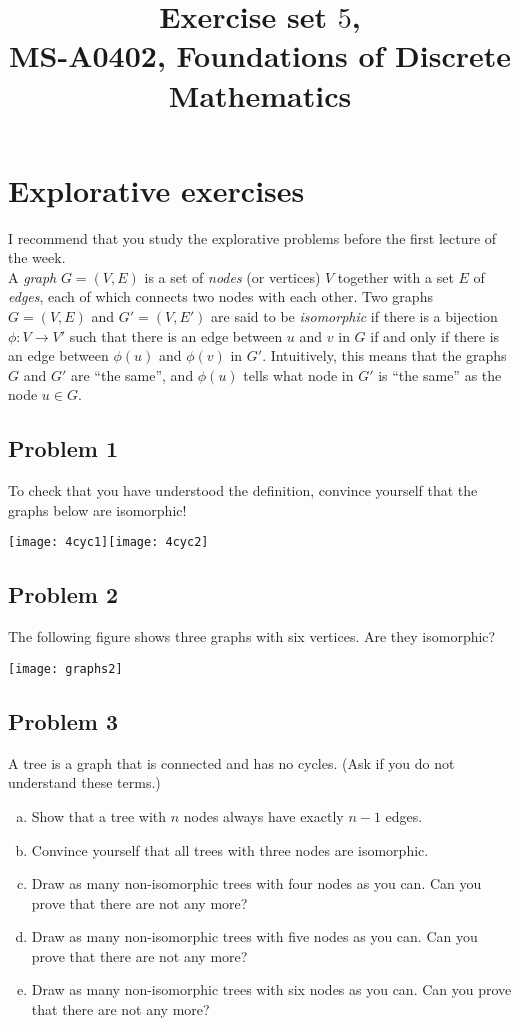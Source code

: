 \documentclass{amsart}
\title{Exercise set $5$, \\ MS-A0402, Foundations of Discrete Mathematics}
\theoremstyle{definition} \newtheorem*{definition}{Definition}
\theoremstyle{remark} \newtheorem*{ex}{Example}
\begin{document}
\hspace{-1cm}
\maketitle
 
\section*{Explorative exercises}
I recommend that you study the explorative problems before the first lecture of the week.\\

A {\em graph} $G=(V,E)$ is a set of {\em nodes} (or vertices) $V$ together with a set $E$ of {\em edges}, each of which connects two nodes with each other. Two graphs $G=(V,E)$ and $G'=(V,E')$ are said to be {\em isomorphic} if there is a bijection $\phi:V\to V'$ such that there is an edge between $u$ and $v$ in $G$ if and only if there is an edge between $\phi(u)$ and $\phi(v)$ in $G'$. Intuitively, this means that the graphs $G$ and $G'$ are ``the same'', and $\phi(u)$ tells what node in $G'$ is ``the same'' as the node $u\in G$. 

\subsection*{Problem 1}To check that you have understood the definition, convince yourself that the graphs below are isomorphic!
\begin{center}
\texttt{[image: 4cyc1]}\hspace{1cm}\texttt{[image: 4cyc2]}
\end{center}


\subsection*{Problem 2} The following figure shows three graphs with six vertices. Are they isomorphic?
\begin{center}
\texttt{[image: graphs2]}
\end{center}

 \subsection*{Problem 3}
A tree is a graph that is connected and has no cycles. (Ask if you do not understand these terms.) 
\begin{enumerate}[a)]
\item Show that a tree with $n$ nodes always have exactly $n-1$ edges. 
\item Convince yourself that all trees with three nodes are isomorphic.
\item Draw as many non-isomorphic trees with four nodes as you can. Can you prove that there are not any more?
\item Draw as many non-isomorphic trees with five nodes as you can. Can you prove that there are not any more?
\item Draw as many non-isomorphic trees with six nodes as you can. Can you prove that there are not any more?
\end{enumerate}
\end{document}
